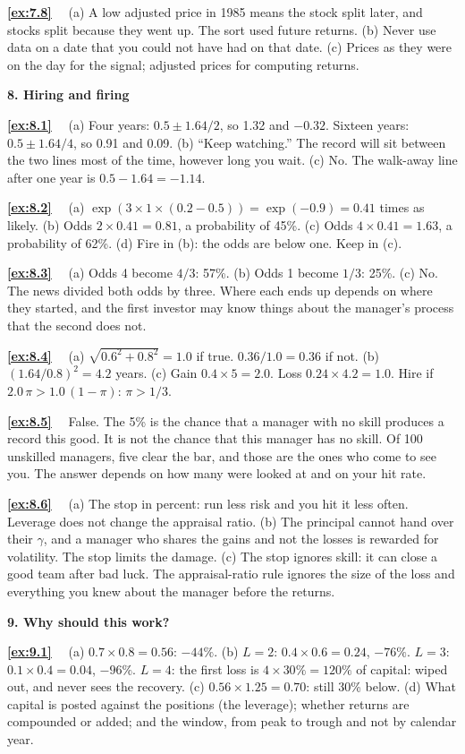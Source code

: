 \documentclass[11pt]{article}
\newcounter{ex}[section]
\newcommand{\sol}[1]{\par\smallskip\textbf{\ref{#1}}\ \ }
\newcommand{\head}[1]{\par\medskip\textbf{#1}\par}
\begin{document}
{\sol{ex:7.8} (a) A low adjusted price in 1985 means the stock split later, and stocks split because they went up. The
sort used future returns. (b) Never use data on a date that you could not have had on that date. (c) Prices as they were
on the day for the signal; adjusted prices for computing returns.

\head{8. Hiring and firing}

\sol{ex:8.1} (a) Four years: $0.5 \pm 1.64/2$, so 1.32 and $-0.32$. Sixteen years: $0.5 \pm 1.64/4$, so 0.91 and 0.09.
(b) ``Keep watching.'' The record will sit between the two lines most of the time, however long you wait. (c) No. The
walk-away line after one year is $0.5 - 1.64 = -1.14$.

\sol{ex:8.2} (a) $\exp(3\times 1\times(0.2 - 0.5)) = \exp(-0.9) = 0.41$ times as likely. (b) Odds $2\times 0.41 = 0.81$, a
probability of 45\%. (c) Odds $4\times 0.41 = 1.63$, a probability of 62\%. (d) Fire in (b): the odds are below one. Keep in
(c).

\sol{ex:8.3} (a) Odds 4 become $4/3$: 57\%. (b) Odds 1 become $1/3$: 25\%. (c) No. The news divided both odds by three.
Where each ends up depends on where they started, and the first investor may know things about the manager's process
that the second does not.

\sol{ex:8.4} (a) $\sqrt{0.6^{2} + 0.8^{2}} = 1.0$ if true. $0.36/1.0 = 0.36$ if not. (b) $(1.64/0.8)^{2} = 4.2$ years. (c) Gain
$0.4\times 5 = 2.0$. Loss $0.24\times 4.2 = 1.0$. Hire if $2.0\,\pi > 1.0\,(1 - \pi)$: $\pi > 1/3$.

\sol{ex:8.5} False. The 5\% is the chance that a manager with no skill produces a record this good. It is not the chance
that this manager has no skill. Of 100 unskilled managers, five clear the bar, and those are the ones who come to see
you. The answer depends on how many were looked at and on your hit rate.

\sol{ex:8.6} (a) The stop in percent: run less risk and you hit it less often. Leverage does not change the appraisal
ratio. (b) The principal cannot hand over their $\gamma$, and a manager who shares the gains and not the losses is
rewarded for volatility. The stop limits the damage. (c) The stop ignores skill: it can close a good team after bad
luck. The appraisal-ratio rule ignores the size of the loss and everything you knew about the manager before the
returns.

\head{9. Why should this work?}

\sol{ex:9.1} (a) $0.7\times 0.8 = 0.56$: $-44\%$. (b) $L = 2$: $0.4\times 0.6 = 0.24$, $-76\%$. $L = 3$: $0.1\times 0.4 = 0.04$,
$-96\%$. $L = 4$: the first loss is $4\times 30\% = 120\%$ of capital: wiped out, and never sees the recovery. (c)
$0.56\times 1.25 = 0.70$: still 30\% below. (d) What capital is posted against the positions (the leverage); whether
returns are compounded or added; and the window, from peak to trough and not by calendar year.

}
\end{document}
